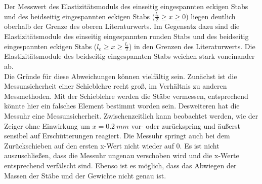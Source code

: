 Der Messwert des Elastizitätsmoduls des einseitig eingespannten eckigen Stabs und des beidseitig eingespannten eckigen Stabs ($\frac{l_{e}}{2} \geq x \geq 0$) liegen deutlich oberhalb der Grenze des oberen Literaturwerts.
Im Gegensatz dazu sind die Elastizitätsmodule des einseitig eingespannten runden Stabs und des beidseitig eingespannten eckigen Stabs ($l_{e} \geq x \geq \frac{l_{e}}{2}$) in den Grenzen des Literaturwerts.
Die Elastizitätsmodule des beidseitig eingespannten Stabs weichen stark voneinander ab.
\\Die Gründe für diese Abweichungen können vielfältig sein.
Zunächst ist die Messunsicherheit einer Schieblehre recht groß, im Verhältnis zu anderen Messmethoden.
Mit der Schieblehre werden die Stäbe vermessen, entsprechend könnte hier ein falsches Element bestimmt worden sein.
Desweiteren hat die Messuhr eine Messunsicherheit.
Zwischenzeitlich kann beobachtet werden, wie der Zeiger ohne Einwirkung um $x=\SI{0.2}{mm}$ vor- oder zurückspring und äußerst sensibel auf Erschütterungen reagiert.
Die Messuhr springt auch bei dem Zurückschieben auf den ersten x-Wert nicht wieder auf 0.
Es ist nicht auszuschließen, dass die Messuhr ungenau verschoben wird und die x-Werte entsprechend verfälscht sind.
Ebenso ist es möglich, dass das Abwiegen der Massen der Stäbe und der Gewichte nicht genau ist.
